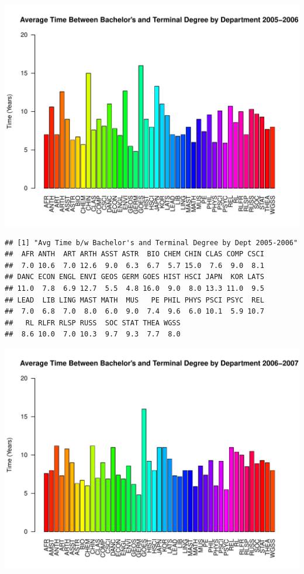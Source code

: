 \documentclass[12pt,a4paper]{article}\usepackage[]{graphicx}\usepackage[]{color}
\makeatletter
\def\maxwidth{ %
  \ifdim\Gin@nat@width>\linewidth
    \linewidth
  \else
    \Gin@nat@width
  \fi
}
\newenvironment{kframe}{%
 \def\at@end@of@kframe{}%
 \ifinner\ifhmode%
  \def\at@end@of@kframe{\end{minipage}}%
  \begin{minipage}{\columnwidth}%
 \fi\fi%
 \def\FrameCommand##1{\hskip\@totalleftmargin \hskip-\fboxsep
 \colorbox{shadecolor}{##1}\hskip-\fboxsep
     \hskip-\linewidth \hskip-\@totalleftmargin \hskip\columnwidth}%
 \MakeFramed {\advance\hsize-\width
   \@totalleftmargin\z@ \linewidth\hsize
   \@setminipage}}%
 {\par\unskip\endMakeFramed%
 \at@end@of@kframe}
\newenvironment{knitrout}{}{} %
\theoremstyle{definition}
\makeatother
\begin{document}
\begin{knitrout}
\includegraphics[width=\maxwidth]{figure/unnamed-chunk-12-2} 
\begin{kframe}\begin{verbatim}
## [1] "Avg Time b/w Bachelor's and Terminal Degree by Dept 2005-2006"
##  AFR ANTH  ART ARTH ASST ASTR  BIO CHEM CHIN CLAS COMP CSCI 
##  7.0 10.6  7.0 12.6  9.0  6.3  6.7  5.7 15.0  7.6  9.0  8.1 
## DANC ECON ENGL ENVI GEOS GERM GOES HIST HSCI JAPN  KOR LATS 
## 11.0  7.8  6.9 12.7  5.5  4.8 16.0  9.0  8.0 13.3 11.0  9.5 
## LEAD  LIB LING MAST MATH  MUS   PE PHIL PHYS PSCI PSYC  REL 
##  7.0  6.8  7.0  8.0  6.0  9.0  7.4  9.6  6.0 10.1  5.9 10.7 
##   RL RLFR RLSP RUSS  SOC STAT THEA WGSS 
##  8.6 10.0  7.0 10.3  9.7  9.3  7.7  8.0
\end{verbatim}
\end{kframe}
\includegraphics[width=\maxwidth]{figure/unnamed-chunk-12-3} 

\end{knitrout}
\end{document}
